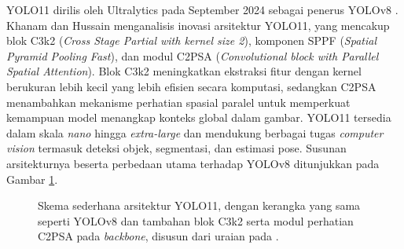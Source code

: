 YOLO11 dirilis oleh Ultralytics pada September 2024 sebagai penerus YOLOv8 
\cite{khanam2024yolov11}. Khanam dan Hussain menganalisis inovasi arsitektur YOLO11, yang 
mencakup blok C3k2 (\textit{Cross Stage Partial with kernel size 2}), komponen SPPF 
(\textit{Spatial Pyramid Pooling Fast}), dan modul C2PSA 
(\textit{Convolutional block with Parallel Spatial Attention}). Blok C3k2 meningkatkan 
ekstraksi fitur dengan kernel berukuran lebih kecil yang lebih efisien secara komputasi, 
sedangkan C2PSA menambahkan mekanisme perhatian spasial paralel untuk memperkuat kemampuan 
model menangkap konteks global dalam gambar. YOLO11 tersedia dalam skala \textit{nano} 
hingga \textit{extra-large} dan mendukung berbagai tugas \textit{computer vision} termasuk 
deteksi objek, segmentasi, dan estimasi pose. Susunan arsitekturnya beserta perbedaan utama 
terhadap YOLOv8 ditunjukkan pada Gambar \ref{fig:arsitektur_yolo11}.

\begin{figure}[htbp]
    \centering
    \caption{Skema sederhana arsitektur YOLO11, dengan kerangka yang sama seperti YOLOv8 dan tambahan blok C3k2 serta modul perhatian C2PSA pada \textit{backbone}, disusun dari uraian pada \cite{khanam2024yolov11}.}
    \label{fig:arsitektur_yolo11}
\end{figure}

